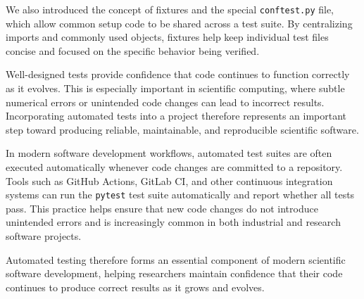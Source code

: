 We also introduced the concept of fixtures and the special \texttt{conftest.py} file, which allow common setup code to be shared across a test suite.  By centralizing imports and commonly used objects, fixtures help keep individual test files concise and focused on the specific behavior being verified.

Well-designed tests provide confidence that code continues to function correctly as it evolves.  This is especially important in scientific computing, where subtle numerical errors or unintended code changes can lead to incorrect results.  Incorporating automated tests into a project therefore represents an important step toward producing reliable, maintainable, and reproducible scientific software.

In modern software development workflows, automated test suites are often executed automatically whenever code changes are committed to a repository. Tools such as GitHub Actions, GitLab CI, and other continuous integration systems can run the \texttt{pytest} test suite automatically and report whether all tests pass.  This practice helps ensure that new code changes do not introduce unintended errors and is increasingly common in both industrial and research software projects.

Automated testing therefore forms an essential component of modern scientific software development, helping researchers maintain confidence that their code continues to produce correct results as it grows and evolves.